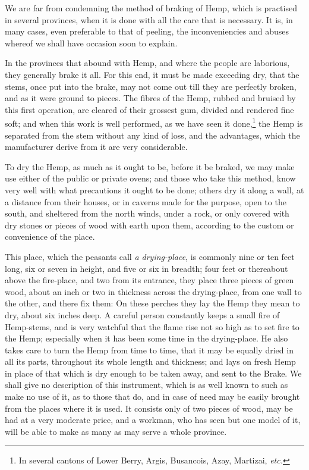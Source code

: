 \documentclass[a4paper, 11pt, oneside, polutonikogreek, english]{article}
\begin{document}
We are far from condemning the method of braking of Hemp, which is practised in several provinces, when it is done with all the care that is necessary. It is, in many cases, even preferable to that of peeling, the inconveniencies and abuses whereof we shall have occasion soon to explain.

In the provinces that abound with Hemp, and where the people are laborious, they generally brake it all. For this end, it must be made exceeding dry, that the stems, once put into the brake, may not come out till they are perfectly broken, and as it were ground to pieces. The fibres of the Hemp, rubbed and bruised by this first operation, are cleared of their grossest gum, divided and rendered fine soft; and when this work is well performed, as we have seen it done,\footnote{In several cantons of Lower Berry, Argis, Busancois, Azay, Martizai, \emph{etc.}} the Hemp is separated from the stem without any kind of loss, and the advantages, which the manufacturer derive from it are very considerable.

To dry the Hemp, as much as it ought to be, before it be braked, we may make use either of the public or private ovens; and those who take this method, know very well with what precautions it ought to be done; others dry it along a wall, at a distance from their houses, or in caverns made for the purpose, open to the south, and sheltered from the north winds, under a rock, or only covered with dry stones or pieces of wood with earth upon them, according to the custom or convenience of the place.

This place, which the peasants call \emph{a drying-place}, is commonly nine or ten feet long, six or seven in height, and five or six in breadth; four feet or thereabout above the fire-place, and two from its entrance, they place three pieces of green wood, about an inch or two in thickness across the drying-place, from one wall to the other, and there fix them: On these perches they lay the Hemp they mean to dry, about six inches deep. A careful person constantly keeps a small fire of Hemp-stems, and is very watchful that the flame rise not so high as to set fire to the Hemp; especially when it has been some time in the drying-place. He also takes care to turn the Hemp from time to time, that it may be equally dried in all its parts, throughout its whole length and thickness; and lays on fresh Hemp in place of that which is dry enough to be taken away, and sent to the Brake. We shall give no description of this instrument, which is as well known to such as make no use of it, as to those that do, and in case of need may be easily brought from the places where it is used. It consists only of two pieces of wood, may be had at a very moderate price, and a workman, who has seen but one model of it, will be able to make as many as may serve a whole province.
\end{document}
